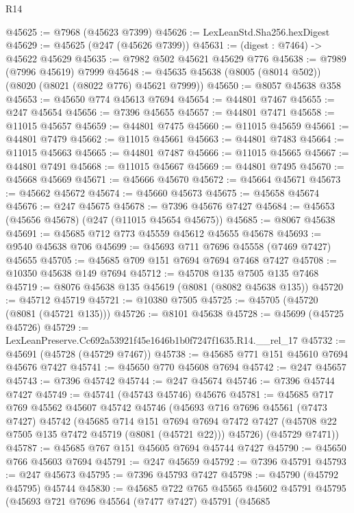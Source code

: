 \begin{lexlean}{R14}
\begin{coremodule}
@45625 := @7968 (@45623 @7399)
@45626 := LexLeanStd.Sha256.hexDigest
@45629 := @45625 (@247 (@45626 @7399))
@45631 := (digest : @7464) -> @45622 @45629
@45635 := @7982 @502 @45621 @45629 @776
@45638 := @7989 (@7996 @45619) @7999
@45648 := @45635 @45638 (@8005 (@8014 @502)) (@8020 (@8021 (@8022 @776) @45621 @7999))
@45650 := @8057 @45638 @358
@45653 := @45650 @774 @45613 @7694
@45654 := @44801 @7467
@45655 := @247 @45654
@45656 := @7396 @45655
@45657 := @44801 @7471
@45658 := @11015 @45657
@45659 := @44801 @7475
@45660 := @11015 @45659
@45661 := @44801 @7479
@45662 := @11015 @45661
@45663 := @44801 @7483
@45664 := @11015 @45663
@45665 := @44801 @7487
@45666 := @11015 @45665
@45667 := @44801 @7491
@45668 := @11015 @45667
@45669 := @44801 @7495
@45670 := @45668 @45669
@45671 := @45666 @45670
@45672 := @45664 @45671
@45673 := @45662 @45672
@45674 := @45660 @45673
@45675 := @45658 @45674
@45676 := @247 @45675
@45678 := @7396 @45676 @7427
@45684 := @45653 (@45656 @45678) (@247 (@11015 @45654 @45675))
@45685 := @8067 @45638
@45691 := @45685 @712 @773 @45559 @45612 @45655 @45678
@45693 := @9540 @45638 @706
@45699 := @45693 @711 @7696 @45558 (@7469 @7427) @45655
@45705 := @45685 @709 @151 @7694 @7694 @7468 @7427
@45708 := @10350 @45638 @149 @7694
@45712 := @45708 @135 @7505 @135 @7468
@45719 := @8076 @45638 @135 @45619 (@8081 (@8082 @45638 @135))
@45720 := @45712 @45719
@45721 := @10380 @7505
@45725 := @45705 (@45720 (@8081 (@45721 @135)))
@45726 := @8101 @45638
@45728 := @45699 (@45725 @45726)
@45729 := LexLeanPreserve.Cc692a53921f45e1646b1b0f7247f1635.R14.__rel_17
@45732 := @45691 (@45728 (@45729 @7467))
@45738 := @45685 @771 @151 @45610 @7694 @45676 @7427
@45741 := @45650 @770 @45608 @7694
@45742 := @247 @45657
@45743 := @7396 @45742
@45744 := @247 @45674
@45746 := @7396 @45744 @7427
@45749 := @45741 (@45743 @45746) @45676
@45781 := @45685
    @717
    @769
    @45562
    @45607
    @45742
    @45746
    (@45693
      @716
      @7696
      @45561
      (@7473 @7427)
      @45742
      (@45685
        @714
        @151
        @7694
        @7694
        @7472
        @7427
        (@45708 @22 @7505 @135 @7472 @45719 (@8081 (@45721 @22)))
        @45726)
      (@45729 @7471))
@45787 := @45685 @767 @151 @45605 @7694 @45744 @7427
@45790 := @45650 @766 @45603 @7694
@45791 := @247 @45659
@45792 := @7396 @45791
@45793 := @247 @45673
@45795 := @7396 @45793 @7427
@45798 := @45790 (@45792 @45795) @45744
@45830 := @45685
    @722
    @765
    @45565
    @45602
    @45791
    @45795
    (@45693
      @721
      @7696
      @45564
      (@7477 @7427)
      @45791
      (@45685

\end{coremodule}
\end{lexlean}
